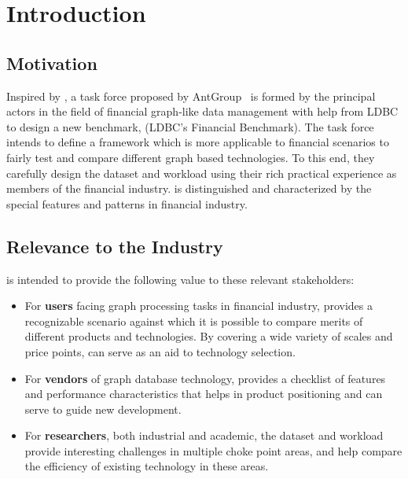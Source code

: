 \chapter{Introduction}
\label{sec:introduction}


\section{Motivation}

Inspired by \ldbcsnb, a task force proposed by AntGroup~\cite{antgroup} is
formed by the principal actors in the field of financial graph-like data
management with help from LDBC to design a new benchmark, \ldbcfinbench (LDBC's
Financial Benchmark). The task force intends to define a framework which is more
applicable to financial scenarios to fairly test and compare different graph
based technologies. To this end, they carefully design the dataset and workload
using  their rich practical experience as members of the financial industry. \ldbcfinbench
is distinguished and characterized by the special features and patterns in
financial industry.


\section{Relevance to the Industry}

\ldbcfinbench is intended to provide the following value to these relevant
stakeholders:

\begin{itemize}
      \item For \textbf{users} facing graph processing tasks in financial industry,
            \ldbcfinbench provides a recognizable scenario against which it is possible
            to compare merits of different products and technologies. By covering a wide
            variety of scales and price points, \ldbcfinbench can serve as an aid to
            technology selection.
      \item For \textbf{vendors} of graph database technology, \ldbcfinbench provides a
            checklist of features and performance characteristics that helps in product
            positioning and can serve to guide new development.
      \item For \textbf{researchers}, both industrial and academic, the \ldbcfinbench
            dataset and workload provide interesting challenges in multiple choke point
            areas, and help compare the efficiency of existing technology in these
            areas.
\end{itemize}

